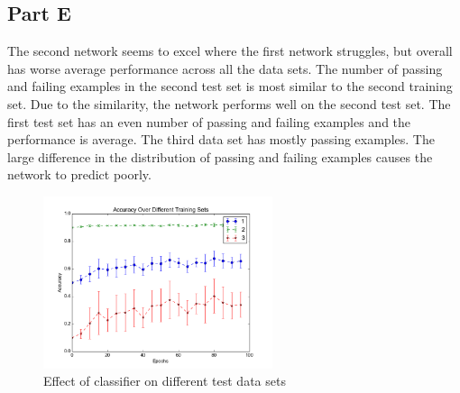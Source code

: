 \subsection{Part E}
The second network seems to excel where the first network struggles, but overall has worse average performance across all the data sets.  The number of passing and failing examples in the second test set is most similar to the second training set.  Due to the similarity, the network performs well on the second test set.  The first test set has an even number of passing and failing examples and the performance is average.  The third data set has mostly passing examples.  The large difference in the distribution of passing and failing examples causes the network to predict poorly.  
\begin{figure}[H]
	\centering
	\includegraphics[width=0.6\textwidth]{../train2/data_sets.png}
	\caption{Effect of classifier on different test data sets}
\end{figure}
